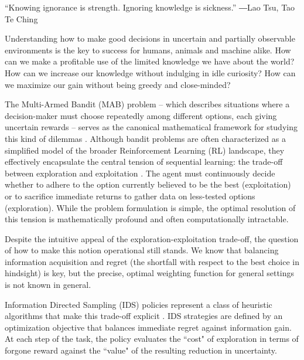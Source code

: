 \documentclass[aps,nofootinbib,groupaddress,superscriptaddress,reprint,amsmath,amssymb,graphicx,onecolumn,prx]{revtex4-2}
\begin{document}
\begin{displayquote}
“Knowing ignorance is strength.  Ignoring knowledge is sickness.”
  ―Lao Tsu, Tao Te Ching
\end{displayquote}

\noindent Understanding how to make good decisions in uncertain and partially observable environments is the key to success for humans, animals and machine alike. How can we make a profitable use of the limited knowledge we have about the world? How can we increase our knowledge without indulging in idle curiosity? How can we maximize our gain without being greedy and close-minded? 

The Multi-Armed Bandit (MAB) problem -- which describes situations where a decision-maker must choose repeatedly among different options, each giving uncertain rewards -- serves as the canonical mathematical framework for studying this kind of dilemmas \cite{robbins1952aspects,Lattimore_Szepesvári_2020}. Although bandit problems are often characterized as a simplified model of the broader Reinforcement Learning (RL) landscape, they effectively encapsulate the central tension of sequential learning: the trade-off between exploration and exploitation \cite{Sutton_Barto_2018}. The agent must continuously decide whether to adhere to the option currently believed to be the best (exploitation) or to sacrifice immediate returns to gather data on less-tested options (exploration). While the problem formulation is simple, the optimal resolution of this tension is mathematically profound and often computationally intractable. 

Despite the intuitive appeal of the exploration-exploitation trade-off, the question of how to make this notion operational still stands. We know that balancing information acquisition and regret (the shortfall with respect to the best choice in hindsight) is key, but the precise, optimal weighting function for general settings is not known in general.

Information Directed Sampling (IDS) policies represent a class of heuristic algorithms that make this trade-off explicit \cite{russo2014learning,russo2018learning,min_information-theoretic_2023,kirschner2020information}. IDS strategies are defined by an optimization objective that balances immediate regret against information gain. At each step of the task, the policy evaluates the ``cost" of exploration in terms of forgone reward against the ``value" of the resulting reduction in uncertainty. 
\end{document}
